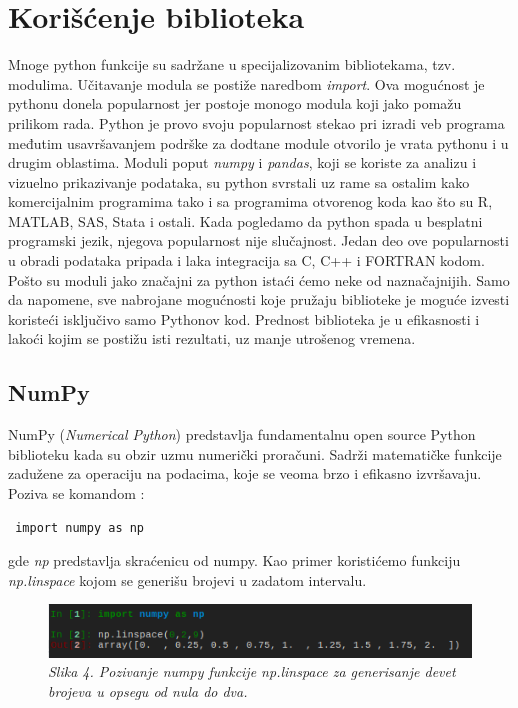 \documentclass[12pt]{article}
\begin{document}
 \section{Korišćenje biblioteka}
Mnoge python funkcije su sadržane u specijalizovanim bibliotekama, tzv. modulima. Učitavanje modula se postiže naredbom \textsl{import}. Ova mogućnost je pythonu donela popularnost jer postoje monogo modula koji jako pomažu prilikom rada. Python je provo svoju popularnost stekao pri izradi veb programa međutim usavršavanjem podrške za dodtane module otvorilo je vrata pythonu i u drugim oblastima. Moduli poput \textsl{numpy} i \textsl{pandas}, koji se koriste za analizu i vizuelno prikazivanje podataka, su python svrstali uz rame sa ostalim kako komercijalnim programima tako i sa programima otvorenog koda kao što su R, MATLAB, SAS, Stata i ostali. Kada pogledamo da python spada u besplatni programski jezik, njegova popularnost nije slučajnost. Jedan deo ove popularnosti u obradi podataka pripada i laka integracija sa C, C++ i FORTRAN kodom.  
Pošto su moduli jako značajni za python istaći ćemo neke od naznačajnijih. Samo da napomene, sve nabrojane mogućnosti koje pružaju biblioteke je moguće izvesti koristeći isključivo samo Pythonov kod. Prednost biblioteka je u efikasnosti i lakoći kojim se postižu isti rezultati, uz manje utrošenog vremena.  
\subsection{NumPy}
NumPy (\textsl{Numerical Python}) predstavlja fundamentalnu open source Python biblioteku kada su obzir uzmu numerički proračuni. Sadrži matematičke funkcije zadužene za operaciju na podacima, koje se veoma brzo i efikasno izvršavaju. Poziva se komandom :
\begin{lstlisting}
 import numpy as np
\end{lstlisting}
gde \textsl{np} predstavlja skraćenicu od numpy. Kao primer koristićemo funkciju \textsl{np.linspace} kojom se generišu brojevi u zadatom intervalu.  
\begin{figure}[h!]
\centering
\includegraphics[width=1.\textwidth]{Screenshot.png}
\caption*{\textsl{Slika 4. Pozivanje numpy funkcije np.linspace za generisanje devet brojeva u opsegu od nula do dva. }}
\end{figure}
\end{document}
